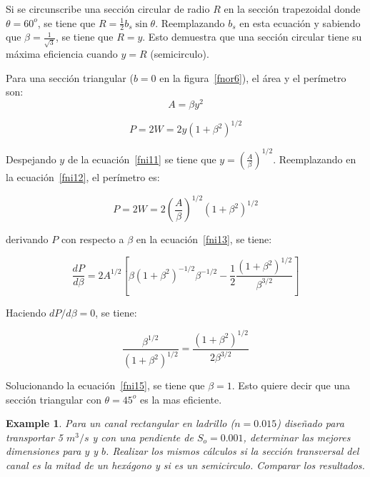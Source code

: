 \documentclass[11pt, oneside]{article}
\newtheorem{exa}{Example}
\begin{document}
Si se circunscribe una secci\'on circular de radio $R$ en la secci\'on trapezoidal donde $\theta=60^o$, se tiene que $R=\frac{1}{2}b_s \sin \theta$. Reemplazando $b_s$ en esta ecuaci\'on y sabiendo que $\beta=\frac{1}{\sqrt{3}}$, se tiene que $R=y$. Esto demuestra que una secci\'on circular tiene su m\'axima eficiencia cuando $y=R$ (semicirculo). 

Para una secci\'on triangular ($b=0$ en la figura~\ref{fnor6}), el \'area y el per\'imetro son:
\begin{equation}
A = \beta y^2
\label{fni11}
\end{equation}

\begin{equation}
P = 2W =  2y \left( 1+\beta^2 \right)^{1/2}
\label{fni12}
\end{equation}

Despejando $y$ de la ecuaci\'on~\ref{fni11} se tiene que $y = \left( \frac{A}{\beta} \right)^{1/2}$. Reemplazando en la ecuaci\'on~\ref{fni12}, el per\'imetro es:

\begin{equation}
P = 2W =  2\left(\frac{A}{\beta}\right)^{1/2} \left( 1+\beta^2 \right)^{1/2}
\label{fni13}
\end{equation}

derivando $P$ con respecto a $\beta$ en la ecuaci\'on~\ref{fni13}, se tiene:

\begin{equation}
\frac{dP}{d\beta} =2A^{1/2}\left[ \beta \left( 1+\beta^2 \right)^{-1/2} \beta^{-1/2} - \frac{1}{2} \frac{\left( 1+\beta^2 \right)^{1/2}}{\beta^{3/2}} \right]
\label{fni14}
\end{equation}

Haciendo $dP/d\beta = 0$, se tiene:

\begin{equation}
\frac{\beta^{1/2}}{\left( 1+\beta^2 \right)^{1/2}} = \frac{\left( 1+\beta^2 \right)^{1/2}}{2 \beta^{3/2}}
\label{fni15}
\end{equation}

Solucionando la ecuaci\'on~\ref{fni15}, se tiene que $\beta=1$. Esto quiere decir que una secci\'on triangular con $\theta=45^o$ es la mas eficiente.

\begin{shaded}
\begin{exa}
Para un canal rectangular en ladrillo ($n=0.015$) dise\~nado para transportar 5 $m^3 /s$ y con una pendiente de $S_o = 0.001$, determinar las mejores dimensiones para $y$ y $b$. Realizar los mismos c\'alculos si la secci\'on transversal del canal es la mitad de un hex\'agono y si es un semicirculo. Comparar los resultados.  
\end{exa}
\end{shaded}


\end{document}
